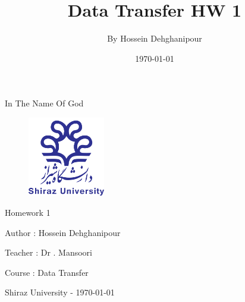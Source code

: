 \documentclass[a4paper,12pt]{book}
\newcommand{\thedate}{\today}
\begin{document}
\title{\Large{\textbf{Data Transfer HW 1}}}
\author{By Hossein Dehghanipour}
\date{\today}
\maketitle

 \begin{center}
{
\centering
{}  
\fontsize{16pt}{16pt}
\selectfont 
\centering
In The Name Of God
}
\newline



\begin{figure}[H]
\centering
\includegraphics[width=0.3\textwidth]{shirazuLogo.png}
\caption*{}
\label{f-0-0}
\end{figure}



{
\centering
{}  
\fontsize{14pt}{14pt}
\selectfont 
Homework 1
}

{
\centering
{}  
\fontsize{12pt}{12pt}
\selectfont 
Author : Hossein Dehghanipour
}

{
\centering
{}  
\fontsize{12pt}{12pt}
\selectfont 
Teacher : Dr . Mansoori
}

{
\centering
{}  
\fontsize{12pt}{12pt}
\selectfont 
Course : Data Transfer
}

{
\centering
{}  
\fontsize{12pt}{12pt}
\selectfont 
Shiraz University - \thedate
}

\end{center}

\setmainfont{Times New Roman}
\cleardoublepage 
{}
\tableofcontents
\thispagestyle{empty}
\cleardoublepage
{}


\fontsize{15pt}{15pt}
\newcommand{\nnl}{\newline \noindent}
\newcommand{\ptx}{ P_{tx} }
\newcommand{\prx}{ P_{rx} }
\end{document}
